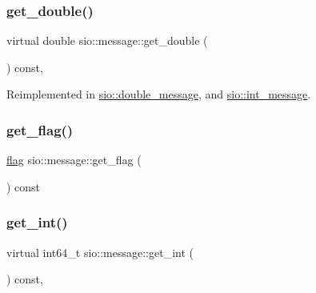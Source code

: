 \subsubsection{\texorpdfstring{get\+\_\+double()}{get\_double()}}
{\footnotesize\ttfamily virtual double sio\+::message\+::get\+\_\+double (\begin{DoxyParamCaption}{ }\end{DoxyParamCaption}) const\hspace{0.3cm}{\ttfamily [inline]}, {\ttfamily [virtual]}}



Reimplemented in \hyperlink{classsio_1_1double__message_a0ab6e4c4e579356b367bb0ef37e79c62}{sio\+::double\+\_\+message}, and \hyperlink{classsio_1_1int__message_a7fdc141b0fe04ce1b75054b6de110f2c}{sio\+::int\+\_\+message}.

\mbox{\label{classsio_1_1message_a2c8eb600ca29b420a5a1d826f0f6d5e6}} 
\subsubsection{\texorpdfstring{get\+\_\+flag()}{get\_flag()}}
{\footnotesize\ttfamily \hyperlink{classsio_1_1message_a5274f78a8f77cd535d4acf476badf769}{flag} sio\+::message\+::get\+\_\+flag (\begin{DoxyParamCaption}{ }\end{DoxyParamCaption}) const\hspace{0.3cm}{\ttfamily [inline]}}

\mbox{\label{classsio_1_1message_ae77c363200284d6741f0ac92f0e13ed2}} 
\subsubsection{\texorpdfstring{get\+\_\+int()}{get\_int()}}
{\footnotesize\ttfamily virtual int64\+\_\+t sio\+::message\+::get\+\_\+int (\begin{DoxyParamCaption}{ }\end{DoxyParamCaption}) const\hspace{0.3cm}{\ttfamily [inline]}, {\ttfamily [virtual]}}



